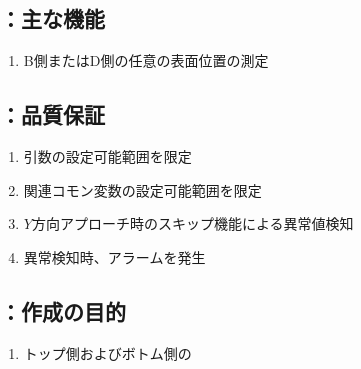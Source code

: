 \subsection{\DMLthreeBD：主な機能}
\begin{enumerate}[label*=\sarrow]
\item B側またはD側の任意の\Dimple 表面位置の測定
\end{enumerate}


\subsection{\DMLthreeBD：品質保証}
\begin{enumerate}[label*=\sarrow]
\item {}引数の設定可能範囲を限定
\item 関連コモン変数の設定可能範囲を限定
\item $Y$方向アプローチ時のスキップ機能による異常値検知
\item 異常検知時、アラームを発生
\end{enumerate}



\clearpage


\subsection{\KEndFaceRight：作成の目的}
\begin{enumerate}[label*=\sarrow]
\item トップ側およびボトム側の\EndFacecutMilling
\end{enumerate}



